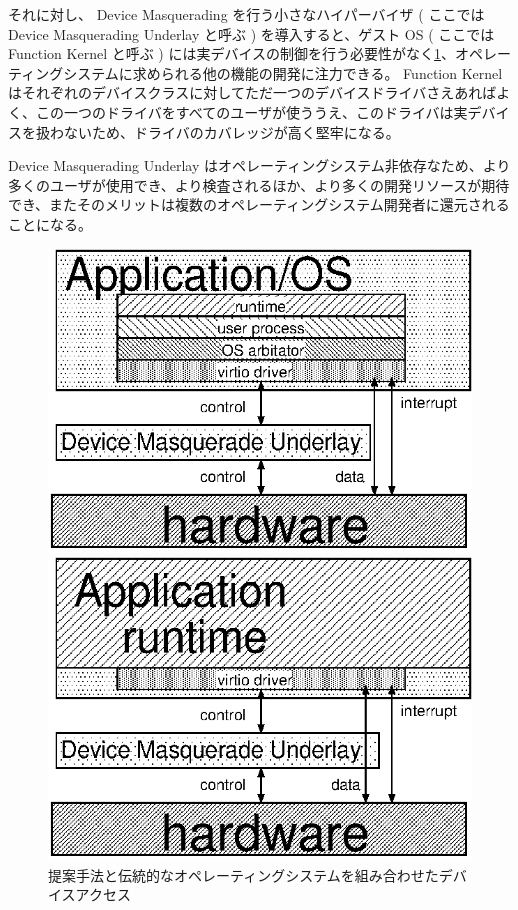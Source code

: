 \documentclass[a4paper,11pt,report]{ltjsbook}
\begin{document}
それに対し、 Device Masquerading を行う小さなハイパーバイザ ( ここでは Device Masquerading Underlay と呼ぶ ) を導入すると、ゲスト OS ( ここでは Function Kernel と呼ぶ ) には実デバイスの制御を行う必要性がなく\ref{underlayarch}、オペレーティングシステムに求められる他の機能の開発に注力できる。 Function Kernel はそれぞれのデバイスクラスに対してただ一つのデバイスドライバさえあればよく、この一つのドライバをすべてのユーザが使ううえ、このドライバは実デバイスを扱わないため、ドライバのカバレッジが高く堅牢になる。%

Device Masquerading Underlay はオペレーティングシステム非依存なため、より多くのユーザが使用でき、より検査されるほか、より多くの開発リソースが期待でき、またそのメリットは複数のオペレーティングシステム開発者に還元されることになる。

\begin{figure}[htbp]
  \begin{minipage}{0.5\hsize}
  \begin{center}
    \includegraphics[width=\textwidth]{./underlay.eps}
    \caption{提案手法と伝統的なオペレーティングシステムを組み合わせたデバイスアクセス}
    \label{underlayarch}
  \end{center}
  \end{minipage}
  \begin{minipage}{0.5\hsize}
  \begin{center}
    \includegraphics[width=\textwidth]{./underlay_unikernel.eps}

\end{center}
\end{minipage}
\end{figure}
\end{document}
